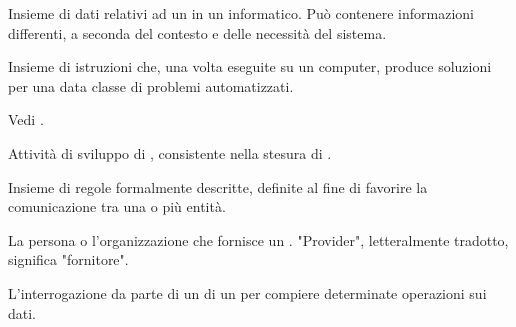 {Insieme di dati relativi ad un  in un  informatico. Può contenere informazioni differenti, a seconda del contesto e delle necessità del sistema.}

{Insieme di istruzioni che, una volta eseguite su un computer, produce soluzioni per una data classe di problemi automatizzati.}

{Vedi .}

{Attività di sviluppo di , consistente nella stesura di .}

{Insieme di regole formalmente descritte, definite al fine di favorire la comunicazione tra una o più entità.}

{La persona o l'organizzazione che fornisce un . "Provider", letteralmente tradotto, significa "fornitore".}




{L'interrogazione da parte di un  di un  per compiere determinate operazioni sui dati.}




